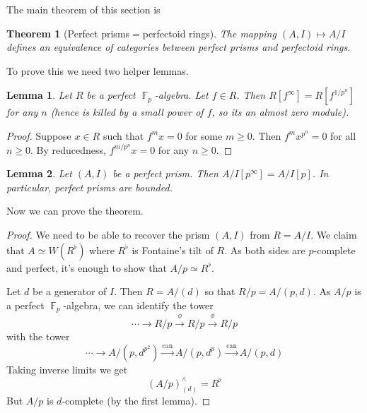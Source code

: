 \documentclass[12pt]{amsproc}
\newtheorem*{thm}{Theorem}
\newtheorem{lemma}{Lemma}
\theoremstyle{definition}
\newcommand{\sma}{\wedge}
\newcommand{\htpyeq}{\simeq}
\newcommand{\ra}{\rightarrow}
\newcommand{\xra}{\xrightarrow}
\DeclareMathOperator{\F}{\mathbb{F}}
\begin{document}
The main theorem of this section is

\begin{thm}[Perfect prisms$=$perfectoid rings] The mapping $(A,I)\mapsto A/I$ defines an equivalence of categories between perfect prisms and perfectoid rings.
\end{thm}

To prove this we need two helper lemmas.

\begin{lemma} Let $R$ be a perfect $\F_p$-algebra. Let $f\in R$. Then $R[f^\infty]=R[f^{1/p^n}]$ for any $n$ (hence is killed by a small power of $f$, so its an \textit{almost zero} module).
\end{lemma}
\begin{proof}
Suppose $x\in R$ such that $f^m x=0$ for some $m\ge 0$. Then $f^m x^{p^n}=0$ for all $n\ge 0$. By reducedness, $f^{m/p^n}x=0$ for any $n\ge 0$.
\end{proof}

\begin{lemma} Let $(A,I)$ be a perfect prism. Then $A/I[p^\infty]=A/I[p]$. In particular, perfect prisms are bounded.
\end{lemma}

Now we can prove the theorem.

\begin{proof}
We need to be able to recover the prism $(A,I)$ from $R=A/I$. We claim that $A\htpyeq W(R^\flat)$ where $R^\flat$ is Fontaine's tilt of $R$. As both sides are $p$-complete and perfect, it's enough to show that $A/p\htpyeq R^\flat$. 

Let $d$ be a generator of $I$. Then $R=A/(d)$ so that $R/p=A/(p,d)$. As $A/p$ is a perfect $\F_p$-algebra, we can identify the tower
\[	\cdots\ra R/p\xra{\phi} R/p\xra{\phi} R/p	\]
with the tower
\[	\cdots\ra A/(p,d^{p^2})\xra{\text{can}} A/(p,d^p)\xra{\text{can}} A/(p,d)	\]
Taking inverse limits we get
\[	(A/p)^{\sma}_{(d)}=R^\flat	\]
But $A/p$ is $d$-complete (by the first lemma).
\end{proof}
\end{document}
